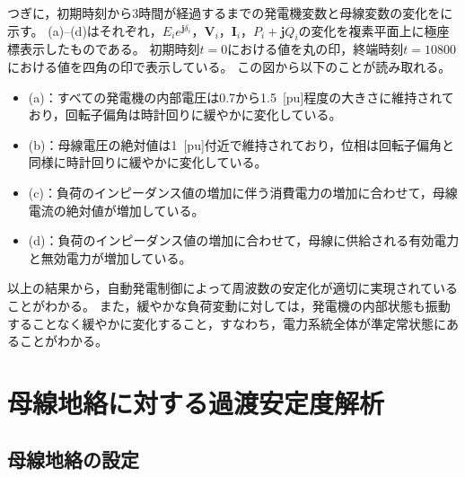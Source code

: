 \documentclass[tombow,dvipdfmx]{corona-a5-1.1}
\begin{document}
つぎに，初期時刻から3時間が経過するまでの発電機変数と母線変数の変化をに示す。
(a)--(d)はそれぞれ，$E_i e^{\bm{j} \delta_i}$，$\bm{V}_i$，$\bm{I}_i$，$P_i+\bm{j}Q_i$の変化を複素平面上に極座標表示したものである。
初期時刻$t=0$における値を丸の印，終端時刻$t=10800$における値を四角の印で表示している。
この図から以下のことが読み取れる。

\begin{itemize}
\item {}(a)：すべての発電機の内部電圧は0.7から1.5~[pu]程度の大きさに維持されており，回転子偏角は時計回りに緩やかに変化している。
\item {}(b)：母線電圧の絶対値は1~[pu]付近で維持されており，位相は回転子偏角と同様に時計回りに緩やかに変化している。
\item {}(c)：負荷のインピーダンス値の増加に伴う消費電力の増加に合わせて，母線電流の絶対値が増加している。
\item {}(d)：負荷のインピーダンス値の増加に合わせて，母線に供給される有効電力と無効電力が増加している。
\end{itemize}

以上の結果から，自動発電制御によって周波数の安定化が適切に実現されていることがわかる。
また，緩やかな負荷変動に対しては，発電機の内部状態も振動することなく緩やかに変化すること，すなわち，電力系統全体が準定常状態にあることがわかる。




\section{母線地絡に対する過渡安定度解析}\label{sec:IEEE68PSS}

\subsection{母線地絡の設定}
\end{document}

